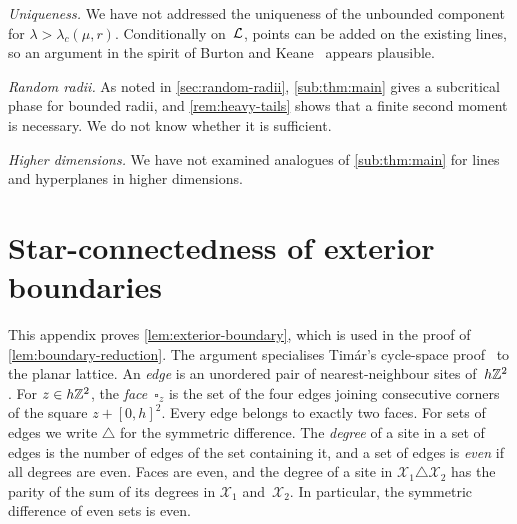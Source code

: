 \documentclass[11pt,letterpaper]{article}
\begin{document}
\emph{Uniqueness.} We have not addressed the uniqueness of the unbounded component for $\lambda>\lambda_c(\mu,r)$. Conditionally on~$\mathcal L$, points can be added on the existing lines, so an argument in the spirit of Burton and Keane~\cite{BK89} appears plausible.

\emph{Random radii.} As noted in \cref{sec:random-radii}, \cref{sub:thm:main} gives a subcritical phase for bounded radii, and \cref{rem:heavy-tails} shows that a finite second moment is necessary. We do not know whether it is sufficient.

\emph{Higher dimensions.} We have not examined analogues of \cref{sub:thm:main} for lines and hyperplanes in higher dimensions.

\appendix
\section{Star-connectedness of exterior boundaries}
\label{sec:star-connected}

This appendix proves \cref{lem:exterior-boundary}, which is used in the proof of \cref{lem:boundary-reduction}. The argument specialises Tim\'ar's cycle-space proof~\cite[Lemma~2]{Tim13} to the planar lattice. An \emph{edge} is an unordered pair of nearest-neighbour sites of~$h\mathbb Z^2$. For $z\in h\mathbb Z^2$, the \emph{face}~$\square_z$ is the set of the four edges joining consecutive corners of the square $z+[0,h]^2$. Every edge belongs to exactly two faces. For sets of edges we write $\triangle$ for the symmetric difference. The \emph{degree} of a site in a set of edges is the number of edges of the set containing it, and a set of edges is \emph{even} if all degrees are even. Faces are even, and the degree of a site in $\mathcal X_1\triangle\mathcal X_2$ has the parity of the sum of its degrees in $\mathcal X_1$ and~$\mathcal X_2$. In particular, the symmetric difference of even sets is even.

\end{document}

